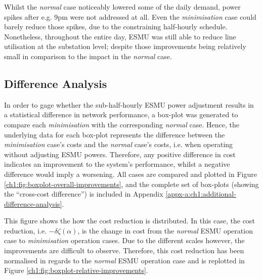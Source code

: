 

Whilst the \textit{normal} case noticeably lowered some of the daily demand, power spikes after e.g. 9pm were not addressed at all.
Even the \textit{minimisation} case could barely reduce those spikes, due to the constraining half-hourly schedule.
Nonetheless, throughout the entire day, ESMU was still able to reduce line utilisation at the substation level; despite those improvements being relatively small in comparison to the impact in the \textit{normal} case.

\subsection{Difference Analysis}
\label{ch1:subsec:difference-analysis}

In order to gage whether the sub-half-hourly ESMU power adjustment results in a statistical difference in network performance, a box-plot was generated to compare each \textit{minimisation} with the corresponding \textit{normal} case.
Hence, the underlying data for each box-plot represents the difference between the \textit{minimisation} case's costs and the \textit{normal} case's costs, i.e. when operating without adjusting ESMU powers.
Therefore, any positive difference in cost indicates an improvement to the system's performance, whilst a negative difference would imply a worsening.
All cases are compared and plotted in Figure \ref{ch1:fig:boxplot-overall-improvements}, and the complete set of box-plots (showing the ``cross-cost difference'') is included in Appendix \ref{appx-a:ch1:additional-difference-analysis}.



This figure shows the how the cost reduction is distributed.
In this case, the cost reduction, i.e. $-\delta\zeta(\alpha)$, is the change in cost from the \textit{normal} ESMU operation case to \textit{minimisation} operation cases.
Due to the different scales however, the improvements are difficult to observe.
Therefore, this cost reduction has been normalised in regards to the \textit{normal} ESMU operation case and is replotted in Figure \ref{ch1:fig:boxplot-relative-improvements}.




